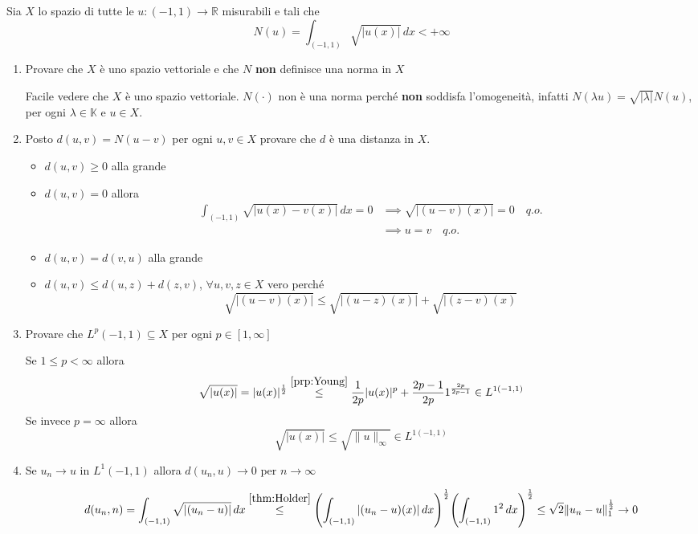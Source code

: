 \begin{eser}[Es. 3 del 23\--01\--2019]
    Sia \(X\) lo spazio di tutte le \(u : {(-1, 1)} \to \mathbb{R}\) misurabili
    e tali che
    \[
      N{(u)} = \int _{{(-1, 1)}} \sqrt{|u{(x)}|}  \,dx < +\infty
    \]
\begin{enumerate}[label = \alph*.]
    \item Provare che \(X\) è uno spazio vettoriale e che \(N\) \textbf{non} definisce
        una norma in \(X\) 

        Facile vedere che \(X\) è uno spazio vettoriale. \(N{(\cdot )}\) non è
        una norma perché \textbf{non} soddisfa l'omogeneità, infatti
        \(N{(\lambda u)} = \sqrt{|\lambda|} N{(u)}\), per ogni \(\lambda \in
        \mathbb{K}\) e \(u \in X\).
    \item Posto \(d{(u, v)} = N{(u -v)}\) per ogni \(u, v  \in  X\) provare che
        \(d\) è una distanza in \(X\).

        \begin{itemize}[label = --]
            \item \(d {(u, v)} \ge 0\) alla grande
            \item \(d{(u, v )} = 0\) allora
                \begin{align*}
                    \int_{{(-1, 1)}} \sqrt{|u{(x)} - v{(x)}|} \,dx = 0 &\implies
                  \sqrt{|(u-v){(x)}|} = 0 \quad q.o. \\ &\implies u = v \quad q.o.
                \end{align*}
            \item \(d{(u, v)} = d{(v, u)}\) alla grande
            \item \(d{(u, v)} \le d{(u, z)} + d{(z, v)}\), \(\forall u, v, z \in
                X\) vero perché
                \[
                    \sqrt{|{(u-v)}{(x)}|} \le \sqrt{|{(u-z)}{(x)}|} +
                    \sqrt{|{(z-v)}{(x)}}
                \]
        \end{itemize}
    \item Provare che \(L^{p}{(-1, 1)} \subseteq X \) per ogni \(p \in [1, \infty]\) 

        Se \(1 \le p < \infty\) allora
        \[
            \sqrt{|u{(x)|}} = |u{(x)}|^{\frac{1}{2}} \overset{\ref{prp:Young}}{\le } \frac{1}{2p}
            |u{(x)}|^{p} + \frac{2p-1}{2p}1^{\frac{2p}{2p-1}} \in L^{1{(-1, 1)}}
        \]
        Se invece \(p = \infty\) allora
        \[
          \sqrt{|u{(x)}|} \le \sqrt{\|u\|_{\infty} } \in L^{1{(-1, 1)}}
        \]
    \item Se \(u_{n} \to u\) in \(L^{1}{(-1, 1)}\) allora \(d{(u_{n}, u)} \to
        0\) per \(n \to \infty\) 

        \[
          d{(u_{n}, n)} = \int _{{(-1, 1)}} \sqrt{|{(u_{n} - u)}|} \,dx
          \overset{\ref{thm:Holder}}{\le } {\left( \int _{{(-1, 1)}} |{(u_{n}
          -u)}{(x)}| \,dx \right)}^{\frac{1}{2}} {\left( \int _{{(-1, 1)}} 1^{2}
  \,dx \right)}^{\frac{1}{2}} \le \sqrt{2}\|u_{n} -u\|_1^{\frac{1}{2}} \to 0
        \]
\end{enumerate}
\end{eser}
